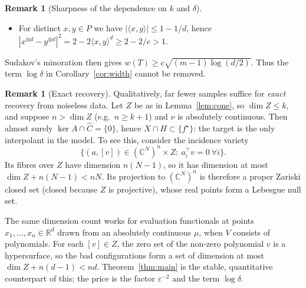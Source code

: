 \documentclass[11pt]{article}
\theoremstyle{definition}
\newtheorem{remark}[theorem]{Remark}
\numberwithin{equation}{section}
\newcommand{\R}{\mathbb{R}}
\newcommand{\C}{\mathbb{C}}
\newcommand{\eps}{\varepsilon}
\newcommand{\fs}{f^{\star}}
\newcommand{\Ch}{\widehat{C}}
\begin{document}
\begin{remark}[Sharpness of the dependence on $k$ and $\delta$]
\begin{enumerate}
\begin{itemize}
\item For distinct $x,y\in P$ we have $|\langle x,y\rangle|\le1-1/d$, hence $|x^{\otimes d}-y^{\otimes d}|^2=2-2\langle x,y\rangle^d\ge2-2/e>1$.
\end{itemize}
Sudakov's minoration \cite[Thm.~7.4.1]{Vershynin} then gives $w(T)\ge c\sqrt{(m-1)\log(d/2)}$. Thus the term $\log\delta$ in Corollary~\ref{cor:width} cannot be removed.
\end{enumerate}
\end{remark}

\begin{remark}[Exact recovery]\label{rem:recovery}
Qualitatively, far fewer samples suffice for \emph{exact} recovery from noiseless data. Let $Z$ be as in Lemma~\ref{lem:cone}, so $\dim Z\le k$, and suppose $n>\dim Z$ (e.g.\ $n\ge k+1$) and $\nu$ is absolutely continuous. Then almost surely $\ker A\cap\Ch=\{0\}$, hence $X\cap H\subset\{\fs\}$: the target is the only interpolant in the model. To see this, consider the incidence variety
\[
\big\{(a,[v])\in(\C^N)^n\times Z:\ a_i^\top v=0\ \forall i\big\}.
\]
Its fibres over $Z$ have dimension $n(N-1)$, so it has dimension at most $\dim Z+n(N-1)<nN$. Its projection to $(\C^N)^n$ is therefore a proper Zariski closed set (closed because $Z$ is projective), whose real points form a Lebesgue null set.

The same dimension count works for evaluation functionals at points $x_1,\dots,x_n\in\R^d$ drawn from an absolutely continuous $\mu$, when $V$ consists of polynomials. For each $[v]\in Z$, the zero set of the non-zero polynomial $v$ is a hypersurface, so the bad configurations form a set of dimension at most $\dim Z+n(d-1)<nd$. Theorem~\ref{thm:main} is the stable, quantitative counterpart of this; the price is the factor $\eps^{-2}$ and the term $\log\delta$.
\end{remark}
\end{document}
